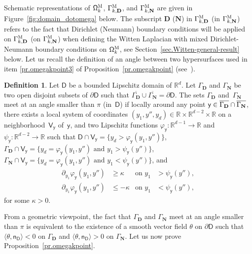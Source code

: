 \documentclass[JEP,XML,SOM,Unicode,NoEqCountersInSection,NoFloatCountersInSection,published]{cedram}
\newcommand{\mbf}[1]{\mathbf{#1}}
\let\pa\partial
\theoremstyle{plain}
\theoremstyle{definition}
\newtheorem{definition}[proposition]{Definition}
\begin{document}
Schematic representations of $\mathsf \Omega_k^{\textsc{M}}$, $\Gamma_{k,\mbf D}^{\textsc{M}}$, and $\Gamma_{k,\mbf N}^{\textsc{M}}$ are given in Figure~\ref{fig:domain_dotomega} below.
The subscript $\mbf D$ (\resp $\mbf N$) in $\Gamma_{k,\mbf D}^{\textsc{M}}$ (\resp in $\Gamma_{k,\mbf N}^{\textsc{M}}$) refers to the fact that Dirichlet (\resp Neumann) boundary conditions will be applied on $\Gamma_{k,\mbf D}^{\textsc{M}}$ (\resp on $\Gamma_{k,\mbf N}^{\textsc{M}}$) when defining the Witten Laplacian with mixed Dirichlet-Neumann boundary conditions on $\mathsf \Omega_k^{\textsc{M}}$, see Section~\ref{sec.Witten-general-result} below.
Let us recall the definition of an angle between two hypersurfaces used in item \eqref{pr.omegakpoint3} of Proposition~\ref{pr.omegakpoint} (see~\cite{brown-94,jakab-mitrea-mitrea-09}).


\begin{definition}\label{de.angle}
Let $\mathsf D$ be a bounded Lipschitz domain of $\mathbb R^d$. Let $\Gamma_{\mbf D}$
and $\Gamma_{\mbf N}$ be two open disjoint subsets of $\partial \mathsf D$ such that $\overline{\Gamma_{\mbf D}} \cup \overline{\Gamma_{\mbf N}} = \pa
\mathsf D$.
The sets $\Gamma_{\mbf D}$ and~$\Gamma_{\mbf N}$ meet at an angle smaller than
$\pi$ (in~$\mathsf D$) if locally around any point
$\mathsf y \in \overline{\Gamma_{\mbf D}} \cap\nobreak \overline{\Gamma_{\mbf N}}$, there exists a local system of coordinates $(y_1,y'',y_d) \in \mathbb R
\times \mathbb R^{d-2} \times \mathbb R$ on a
neighborhood~$\mathsf V_{\mathsf y}$ of~$\mathsf y$, and two Lipschitz functions
$\varphi_{\mathsf y}:\mathbb R^{d-1} \to \mathbb R$ and $ \psi_{\mathsf y}:\mathbb R^{d-2} \to \mathbb R$ such
that $\mathsf D \cap \mathsf V_{\mathsf y}=\{y_d > \varphi_{\mathsf y}(y_1,y'')\}$, $\Gamma_{\mbf D} \cap
\mathsf V_{\mathsf y}=\{y_d= \varphi_{\mathsf y}(y_1,y'') \text{ and } y_1 > \psi_{\mathsf y}(y'')\}$, \hbox{$\Gamma_{\mbf N} \cap
\mathsf V_{\mathsf y}=\{y_d= \varphi_{\mathsf y}(y_1,y'') \text{ and } y_1 < \psi_{\mathsf y}(y'')\}$}, and
\[
\begin{aligned}
\partial_{y_1} \varphi_{\mathsf y} (y_1,y'') &\ge \kappa &\text{on }
y_1&>\psi_{\mathsf y}(y''),\\
\partial_{y_1} \varphi_{\mathsf y} (y_1,y'') &\le -\kappa &\text{on }
y_1&<\psi_{\mathsf y}(y''),
\end{aligned}
\]
for some $\kappa>0$.
\end{definition}
From a geometric viewpoint, the fact that $\Gamma_{\mbf D}$ and $\Gamma_{\mbf N}$ meet at an angle smaller than
$\pi$ is equivalent to the existence of a
smooth vector field $\theta$ on $\partial \mathsf D$ such that
$\langle \theta, \mathsf n_{\mathsf D} \rangle < 0$ on $\Gamma_{\mbf D}$ and $\langle \theta,
\mathsf n_{\mathsf D}\rangle > 0$ on
$\Gamma_{\mbf N}$.
Let us now prove Proposition~\ref{pr.omegakpoint}.
\end{document}
